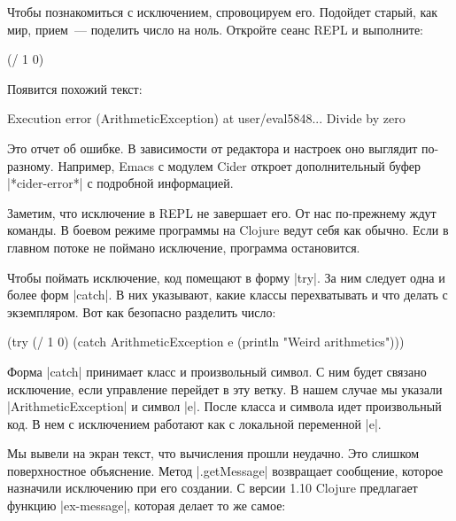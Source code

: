 Чтобы познакомиться с исключением, спровоцируем его. Подойдет старый, как мир,
прием~--- поделить число на ноль. Откройте сеанс REPL и выполните:

\begin{english}
  \begin{clojure}
(/ 1 0)
  \end{clojure}
\end{english}

\noindent
Появится похожий текст:

\begin{english}
  \begin{text}
Execution error (ArithmeticException) at user/eval5848...
Divide by zero
  \end{text}
\end{english}

Это отчет об ошибке. В зависимости от редактора и настроек оно выглядит
по-разному. Например, Emacs с модулем Cider откроет дополнительный буфер
\spverb|*cider-error*| с подробной информацией.

Заметим, что исключение в REPL не завершает его. От нас по-прежнему ждут
команды. В боевом режиме программы на Clojure ведут себя как обычно. Если в
главном потоке не поймано исключение, программа остановится.

Чтобы поймать исключение, код помещают в форму \spverb|try|. За ним следует одна
и более форм \spverb|catch|. В них указывают, какие классы перехватывать и что
делать с экземпляром. Вот как безопасно разделить число:

\begin{english}
  \begin{clojure}
(try
  (/ 1 0)
  (catch ArithmeticException e
    (println "Weird arithmetics")))
  \end{clojure}
\end{english}

Форма \spverb|catch| принимает класс и произвольный символ. С ним будет связано
исключение, если управление перейдет в эту ветку. В нашем случае мы указали
\spverb|ArithmeticException| и символ \spverb|e|. После класса и символа идет
произвольный код. В нем с исключением работают как с локальной переменной
\spverb|e|.

Мы вывели на экран текст, что вычисления прошли неудачно. Это слишком
поверхностное объяснение. Метод \spverb|.getMessage| возвращает сообщение,
которое назначили исключению при его создании. С версии 1.10 Clojure предлагает
функцию \spverb|ex-message|, которая делает то же самое:

